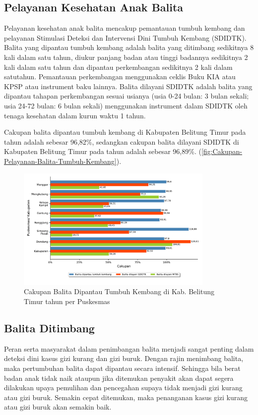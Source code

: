 \subsection{Pelayanan Kesehatan Anak Balita}
Pelayanan kesehatan anak balita mencakup pemantauan tumbuh kembang dan pelayanan Stimulasi Deteksi dan Intervensi Dini Tumbuh Kembang (SDIDTK).
Balita yang dipantau tumbuh kembang adalah  balita yang ditimbang sedikitnya 8 kali dalam satu tahun, diukur panjang badan atau tinggi badannya sedikitnya 2 kali dalam satu tahun dan dipantau perkembangan sedikitnya 2 kali dalam satutahun. Pemantauan perkembangan menggunakan ceklis Buku KIA atau KPSP atau instrument baku lainnya.
Balita dilayani SDIDTK adalah balita yang dipantau tahapan perkembangan sesuai usianya (usia 0-24 bulan: 3 bulan sekali; usia 24-72 bulan: 6 bulan sekali) menggunakan instrument dalam SDIDTK oleh tenaga kesehatan dalam kurun waktu 1 tahun.

Cakupan balita dipantau tumbuh kembang di Kabupaten Belitung Timur pada tahun \tP adalah sebesar 96,82\%, sedangkan cakupan balita dilayani SDIDTK di Kabupaten Belitung Timur pada tahun \tP adalah sebesar 96,89\%. (\autoref{fig:Cakupan-Pelayanan-Balita-Tumbuh-Kembang}).

\begin{figure}[H]
	\centering
	\includegraphics[width=0.85\textwidth]{bab_05/bab_05_23_balitaTumbuhKembang}
	\caption{Cakupan Balita Dipantau Tumbuh Kembang di Kab. Belitung Timur tahun \tP per Puskesmas}
	\label{fig:Cakupan-Pelayanan-Balita-Tumbuh-Kembang}
\end{figure}

\subsection{Balita Ditimbang}
\label{subsec:Balita-Ditimbang}
Peran serta masyarakat dalam penimbangan balita menjadi sangat penting
dalam deteksi dini kasus gizi kurang dan gizi buruk. Dengan rajin
menimbang balita, maka pertumbuhan balita dapat dipantau secara intensif.
Sehingga bila berat badan anak tidak naik ataupun jika ditemukan penyakit
akan dapat segera dilakukan upaya pemulihan dan pencegahan supaya
tidak menjadi gizi kurang atau gizi buruk. Semakin cepat ditemukan,
maka penanganan kasus gizi kurang atau gizi buruk akan semakin baik.\par

